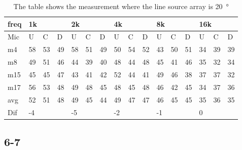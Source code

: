 \begin{table}[H]
\centering
\caption{The table shows the measurement where the line source array is \SI{20}{\degree}}
\begin{tabular}{l|l|l|l|l|l|l|l|l|l|l|l|l|lll}
freq & \multicolumn{3}{l|}{1k} & \multicolumn{3}{l|}{2k} & \multicolumn{3}{l|}{4k} & \multicolumn{3}{l|}{8k} & \multicolumn{3}{l}{16k}                                \\ \hline
Mic  & U      & C      & D     & U      & C      & D     & U      & C      & D     & U      & C      & D     & \multicolumn{1}{l|}{U}  & \multicolumn{1}{l|}{C}  & D  \\ \hline
m4    & 58     & 53     &  49    &   58   &  51    &  49    &   50   &   54    &  52    &  43     &   50   &  51    & \multicolumn{1}{l|}{34} & \multicolumn{1}{l|}{39} & 39 \\
m8    &  49    &  51   &   46   &   44   &   39   &  40    &   48   &   44    &   48   &    45   &    41  &   46   & \multicolumn{1}{l|}{35} & \multicolumn{1}{l|}{32} & 34 \\
m15  &  45    & 45     &   47   &  43    &  41    &  42    & 52     &    44   &   41   &   49    &   46   &   38   & \multicolumn{1}{l|}{37} & \multicolumn{1}{l|}{37} & 32 \\
m17  &  56    & 53     &  48    &  49    & 48     &  45    &  48    &   45    &    48  &   46    &   42   & 45     & \multicolumn{1}{l|}{34} & \multicolumn{1}{l|}{37} & 36 \\ \hline
avg & 52     & 51     &  48    &  49    &  45    &  44    &  49    &   47    & 47     &    46   &   45   &  45    & \multicolumn{1}{l|}{35} & \multicolumn{1}{l|}{36}  & 35  \\ \hline  
Dif & \multicolumn{3}{l|}{-4} & \multicolumn{3}{l|}{-5} & \multicolumn{3}{l|}{-2} & \multicolumn{3}{l|}{-1} & \multicolumn{3}{l}{0}                                
\end{tabular}
\end{table}





\subsection{6-7}

